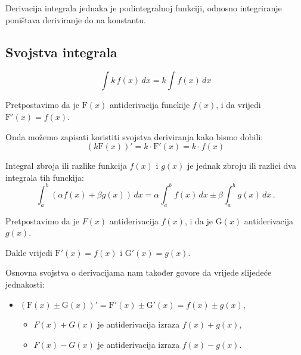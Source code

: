 Derivacija integrala jednaka je podintegralnoj funkciji, odnosno integriranje
poništava deriviranje do na konstantu.

\subsection{Svojstva integrala}

\begin{proposition}
    $$
    \int{{k\,f\left( x \right)\,dx}} = k\int{{f\left( x \right)\,dx}}
    $$
\end{proposition}

Pretpostavimo da je $\mathrm{F}(x)$ antiderivacija funckije $f(x)$,
i da vrijedi $\mathrm{F}'(x) = f(x)$.

Onda možemo zapisati koristiti svojstva deriviranja kako bismo dobili:
$$
    (k\mathrm{F}(x))' = k \cdot \mathrm{F}'(x) = k \cdot f(x)
$$

\begin{proposition}
    Integral zbroja ili razlike funkcija $f(x)$ i $g(x)$ je jednak zbroju ili razlici dva integrala tih funckija:
    $$
    \int_a^b (\alpha f(x) + \beta g(x))\,dx = \alpha \int_a^b f(x)\,dx \pm \beta \int_a^b g(x)\,dx\,.
    $$
\end{proposition}


Pretpostavimo da je $F\left( x \right)$ antiderivacija $f\left( x \right)$,
i da je $\mathrm{G}\left( x \right)$ antiderivacija $g\left( x \right)$.

Dakle vrijedi $\mathrm{F}'\left( x \right) = f\left( x \right)$ i $\mathrm{G}'\left( x \right) =
g\left( x \right)$.

Osnovna svojstva o derivacijama nam također govore da vrijede slijedeće jednakosti:
\begin{itemize}
    \item $\left( \mathrm{F}\left( x \right) \pm \mathrm{G}\left( x
    \right) \right)' =
    \mathrm{F}'\left( x \right) \pm \mathrm{G}'\left( x \right) =
    f\left( x \right) \pm g\left( x \right)$,
    \begin{itemize}
        \item $F\left( x \right) + G\left( x \right)$ je antiderivacija izraza
        $f\left( x \right) + g\left( x \right)$,
        \item $F\left( x \right) - G\left( x
        \right)$ je antiderivacija izraza $f\left( x \right) - g\left( x \right)$.
    \end{itemize}
\end{itemize}

